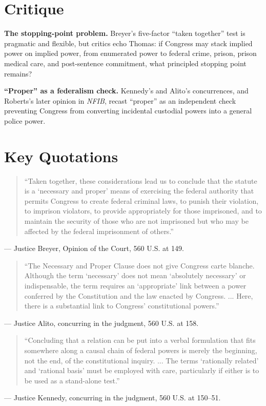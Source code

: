 \documentclass[12pt]{article}
\begin{document}
\section{Critique}

\textbf{The stopping-point problem.} Breyer's five-factor ``taken together'' test is pragmatic and flexible, but critics echo Thomas: if Congress may stack implied power on implied power, from enumerated power to federal crime, prison, prison medical care, and post-sentence commitment, what principled stopping point remains?

\textbf{``Proper'' as a federalism check.} Kennedy's and Alito's concurrences, and Roberts's later opinion in \textit{NFIB}, recast ``proper'' as an independent check preventing Congress from converting incidental custodial powers into a general police power.

\section{Key Quotations}

\begin{quote}
``Taken together, these considerations lead us to conclude that the statute is a `necessary and proper' means of exercising the federal authority that permits Congress to create federal criminal laws, to punish their violation, to imprison violators, to provide appropriately for those imprisoned, and to maintain the security of those who are not imprisoned but who may be affected by the federal imprisonment of others.''
\end{quote}
\noindent --- Justice Breyer, Opinion of the Court, 560 U.S. at 149.

\begin{quote}
``The Necessary and Proper Clause does not give Congress carte blanche. Although the term `necessary' does not mean `absolutely necessary' or indispensable, the term requires an `appropriate' link between a power conferred by the Constitution and the law enacted by Congress. ... Here, there is a substantial link to Congress' constitutional powers.''
\end{quote}
\noindent --- Justice Alito, concurring in the judgment, 560 U.S. at 158.

\begin{quote}
``Concluding that a relation can be put into a verbal formulation that fits somewhere along a causal chain of federal powers is merely the beginning, not the end, of the constitutional inquiry. ... The terms `rationally related' and `rational basis' must be employed with care, particularly if either is to be used as a stand-alone test.''
\end{quote}
\noindent --- Justice Kennedy, concurring in the judgment, 560 U.S. at 150--51.
\end{document}
